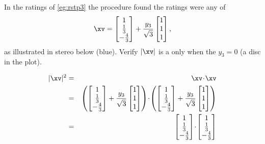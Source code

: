 \begin{example} 
In the  ratings of \autoref{eg:rstp3} the procedure found the ratings were any of
\begin{equation*}
\xv=\begin{bmatrix} 1\\\frac13\\-\frac43 \end{bmatrix}
+\frac{y_3}{\sqrt3}\begin{bmatrix} 1\\1\\1 \end{bmatrix},
\end{equation*}
as illustrated in stereo below (blue).
Verify \(|\xv|\) is a  only when the  \(y_3=0\) (a disc in the plot).
\begin{center}
\end{center}
\begin{solution} 
\begin{eqnarray*}
|\xv|^2&=&\xv\cdot\xv
\\&=&\left(\begin{bmatrix} 1\\\frac13\\-\frac43 \end{bmatrix}
+\frac{y_3}{\sqrt3}\begin{bmatrix} 1\\1\\1 \end{bmatrix}\right)
\cdot\left(\begin{bmatrix} 1\\\frac13\\-\frac43 \end{bmatrix}
+\frac{y_3}{\sqrt3}\begin{bmatrix} 1\\1\\1 \end{bmatrix}\right)
\\&=&\begin{bmatrix} 1\\\frac13\\-\frac43 \end{bmatrix}\cdot\begin{bmatrix} 1\\\frac13\\-\frac43 \end{bmatrix}

\end{eqnarray*}
\end{solution}
\end{example}
